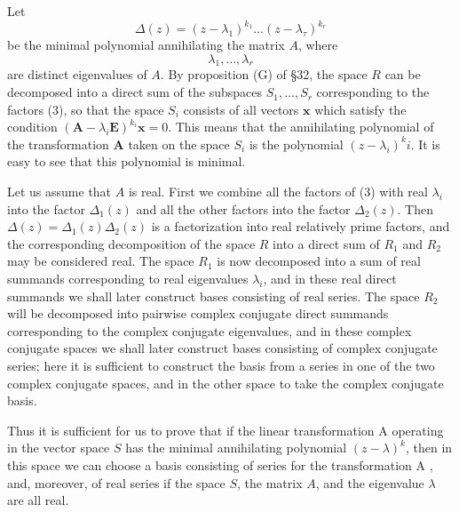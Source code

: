 \documentclass[10pt,a5paper]{book}
\makeatletter
\theoremstyle{plain}
\theoremstyle{definition}
\theoremstyle{remark}
\renewenvironment{proof}[1][\proofname]{\par
  \pushQED{\qed}%
  \normalfont\topsep6\p@\@plus6\p@\relax
  \trivlist
  \item\relax{\itshape #1\@addpunct{.}}\hspace\labelsep\ignorespaces
}{\popQED\endtrivlist\@endpefalse}
\makeatother
\begin{document}
\begin{proof}
Let
\begin{equation*}
\Delta(z)=\left(z-\lambda_{1}\right)^{k_{1}} \ldots\left(z-\lambda_{\tau}\right)^{k_{r}} \tag{3}
\end{equation*}
be the minimal polynomial annihilating the matrix $A$, where
\[
\lambda_{1}, \ldots, \lambda_{r}
\]
are distinct eigenvalues of $A$. By proposition (G) of §32, the space $R$ can be decomposed into a direct sum of the subspaces $S_{1}, \ldots, S_{r}$ corresponding to the factors (3), so that the space $S_{i}$ consists of all vectors $\mathbf{x}$ which satisfy the condition $\left(\mathbf{A}-\lambda_{i} \mathbf{E}\right)^{k_{i}} \mathbf{x}=0$. This means that the annihilating polynomial of the transformation $\mathbf{A}$ taken on the space $S_{i}$ is the polynomial $\left(z-\lambda_{i}\right)^{k} i$. It is easy to see that this polynomial is minimal.

Let us assume that $A$ is real. First we combine all the factors of (3) with real $\lambda_{i}$ into the factor $\Delta_{1}(z)$ and all the other factors into the factor $\Delta_{2}(z)$. Then $\Delta(z)=\Delta_{1}(z) \Delta_{2}(z)$ is a factorization into real relatively prime factors, and the corresponding decomposition of the space $R$ into a direct sum of $R_{1}$ and $R_{2}$ may be considered real. The space $R_{1}$ is now decomposed into a sum of real summands corresponding to real eigenvalues $\lambda_{i}$, and in these real direct summands we shall later construct bases consisting of real series. The space $R_{2}$ will be decomposed into pairwise complex conjugate direct summands corresponding to the complex conjugate eigenvalues, and in these complex conjugate spaces we shall later construct bases consisting of complex conjugate series; here it is sufficient to construct the basis from a series in one of the two complex conjugate spaces, and in the other space to take the complex conjugate basis.

Thus it is sufficient for us to prove that if the linear transformation A operating in the vector space $S$ has the minimal annihilating polynomial $(z-\lambda)^{k}$, then in this space we can choose a basis consisting of series for the transformation A , and, moreover, of real series if the space $S$, the matrix $A$, and the eigenvalue $\lambda$ are all real.


\end{proof}
\end{document}
